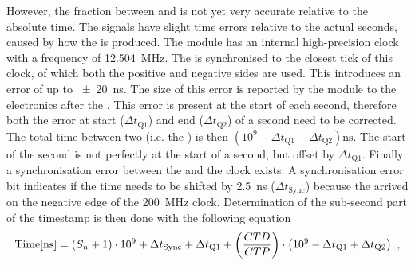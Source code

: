 However, the fraction between \ctd and \ctp is not yet very accurate relative to the absolute \gps time. The \pps signals have slight time errors relative to the actual \gps seconds, caused by how the \pps is produced. The \gps module has an internal high-precision clock with a frequency of  \SI{12.504}{\mega\hertz}. The \pps is synchronised to the closest tick of this clock, of which both the positive and negative sides are used. This introduces an error of up to \SI{\pm 20}{\ns}. The size of this error is reported by the \gps module to the electronics after the \pps. This error is present at the start of each second, therefore both the error at start ($\Delta t_{\mathrm{Q1}}$) and end ($\Delta t_{\mathrm{Q2}}$) of a second need to be corrected. The total time between two \pps (i.e. the \ctp) is then $(10^9 - \Delta t_{\mathrm{Q1}} + \Delta t_{\mathrm{Q2}}) \si{\ns}$. The start of the second is not perfectly at the start of a second, but offset by $\Delta t_{\mathrm{Q1}}$. Finally a synchronisation error between the \pps and the \hisparc clock exists. A synchronisation error bit indicates if the time needs to be shifted by \SI{2.5}{\ns} ($\Delta t_{\mathrm{Sync}}$) because the \pps arrived on the negative edge of the \SI{200}{\mega\hertz} clock. Determination of the sub-second part of the timestamp is then done with the following equation
%
\begin{equation}
\label{eq:timestamp}
   \mathrm{Time[\si{\ns}]} =
      (S_n + 1) \cdot 10^9 +
      \Delta t_{\mathrm{Sync}} + \Delta t_{\mathrm{Q1}} +
      \left(\frac{\ctd}{\ctp}\right) \cdot
      \left(10^9 - \Delta t_{\mathrm{Q1}} + \Delta t_{\mathrm{Q2}}\right) \ ,
\end{equation}
%
